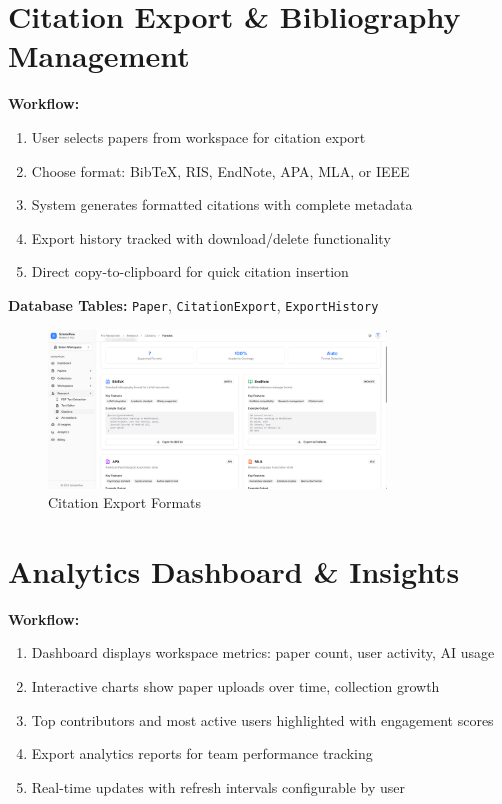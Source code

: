 \section{Citation Export \& Bibliography Management}

\textbf{Workflow:}
\begin{enumerate}[leftmargin=*,topsep=3pt,itemsep=2pt]
    \item User selects papers from workspace for citation export
    \item Choose format: BibTeX, RIS, EndNote, APA, MLA, or IEEE
    \item System generates formatted citations with complete metadata
    \item Export history tracked with download/delete functionality
    \item Direct copy-to-clipboard for quick citation insertion
\end{enumerate}

\textbf{Database Tables:} \texttt{Paper}, \texttt{CitationExport}, \texttt{ExportHistory}

\begin{figure}[H]
\centering
\includegraphics[width=0.8\textwidth]{images/screenshots/citations_formats.png}
\caption{Citation Export Formats}
\label{fig:citations}
\end{figure}

\section{Analytics Dashboard \& Insights}

\textbf{Workflow:}
\begin{enumerate}[leftmargin=*,topsep=3pt,itemsep=2pt]
    \item Dashboard displays workspace metrics: paper count, user activity, AI usage
    \item Interactive charts show paper uploads over time, collection growth
    \item Top contributors and most active users highlighted with engagement scores
    \item Export analytics reports for team performance tracking
    \item Real-time updates with refresh intervals configurable by user
\end{enumerate}

